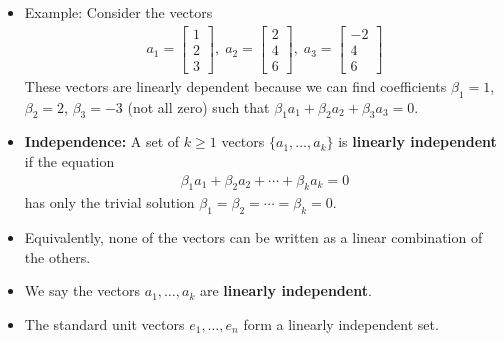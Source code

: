 \begin{frame}{}
\begin{itemize}
    \item  Example: Consider the vectors 
    \begin{align}
        a_1 = \begin{bmatrix}
            1\\2\\3
        \end{bmatrix}, \; a_2 = \begin{bmatrix}
                2\\4\\ 6 
            \end{bmatrix},\; a_3 = \begin{bmatrix}
                -2\\4\\ 6 
            \end{bmatrix}
    \end{align}
    These vectors are linearly dependent because we can find coefficients $\beta_1 = 1$, $\beta_2 = 2$, $\beta_3 = -3$ (not all zero) such that $\beta_1 a_1 + \beta_2 a_2 + \beta_3 a_3 = 0$.
\end{itemize}
\end{frame}

\begin{frame}{}
\begin{itemize}
    \item \textbf{Independence:} A set of $k\geq 1$ vectors $\{a_1, \ldots, a_k \}$ is \textbf{linearly independent} if the equation
    \begin{align}
        \beta_1 a_1 + \beta_2 a_2 + \cdots + \beta_k a_k = 0 
    \end{align}
    has only the trivial solution $\beta_1 = \beta_2 = \cdots = \beta_k = 0$.
    \item Equivalently, none of the vectors can be written as a linear combination of the others.
    \item We say the vectors $a_1, \ldots, a_k$ are \textbf{linearly independent}.
    \item The standard unit vectors $e_1, \ldots, e_n$ form a linearly independent set.
\end{itemize}
\end{frame}

